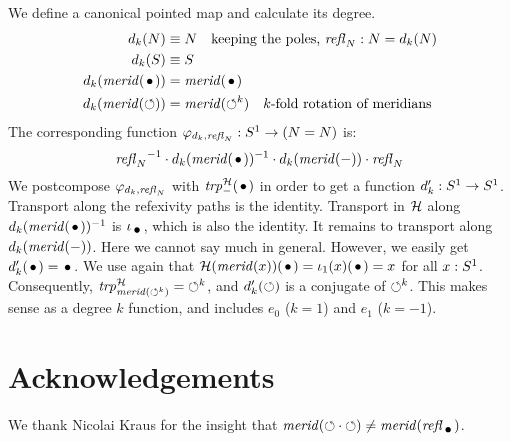 \documentclass[english,a4]{article}
\begin{document}
\begin{example}\label{exa:degree-k-function}
We define a canonical pointed map and calculate its degree.
\begin{align}
  \label{eq:deg-k-func}
  d_k(N)&\jdeq N \quad\text{keeping the poles, $\refl{N}: N=d_k(N)$}\\
  d_k(S)&\jdeq S\\
  d_k(\mrd(\base))&= \mrd(\base)\\
  d_k(\mrd(\Sloop))&= \mrd(\Sloop^{k})\quad\text{$k$-fold rotation of meridians}
\end{align}
The corresponding function $\varphi_{d_k,\refl{N}}: \Sc \to (N=N)$ is:
\[
{\refl{N}}^{-1} \cdot d_k(\mrd(\base))^{-1}\cdot d_k(\mrd(\blank))\cdot \refl{N}
\]
We postcompose $\varphi_{d_k,\refl{N}}$ with $\trp[\hopffam]{\blank}(\base)$
in order to get a function $d'_k :  \Sc \to \Sc$.
Transport along the refexivity paths is the identity. 
Transport in $\hopffam$ along $d_k(\mrd(\base))^{-1}$ is $\iota_{\base}$,
which is also the identity. It remains to transport along $d_k(\mrd(\blank))$.
Here we cannot say much in general. 
However, we easily get $d'_k(\base)=\base$.
We use again that
$\hopffam(\mrd(x))(\base) = \iota_1(x)(\base) = x$ for all $x:\Sc$.
Consequently, $\trp[\hopffam]{ \mrd(\Sloop^{k})} =  \Sloop^{k}$,
and $d'_k(\Sloop)$ is a conjugate of $\Sloop^{k}$.
This makes sense as a degree $k$ function, 
and includes $e_0$ ($k=1$) and $e_1$ ($k=-1$).


\end{example}


\section*{Acknowledgements}
We thank Nicolai Kraus for the insight that
$\mrd(\Sloop\cdot\Sloop) \neq \mrd(\refl{\base})$.
\end{document}
